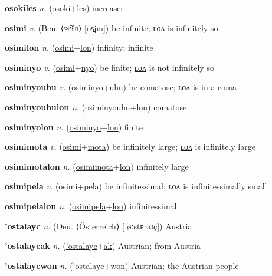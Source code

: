 \textbf{\hypertarget{osokiles}{osokiles}} \textit{n.} (\hyperlink{osoki}{osoki}+\allowbreak \hyperlink{les}{les})
increaser

\textbf{\hypertarget{osimi}{osimi}} \textit{v.} (Ben. ⟨{\bengali{}অসীম}⟩ [os̪im])
be infinite; \hyperlink{osimilon}{ʟᴏᴧ} is infinitely so

\textbf{\hypertarget{osimilon}{osimilon}} \textit{n.} (\hyperlink{osimi}{osimi}+\allowbreak \hyperlink{lon}{lon})
infinity; infinite

\textbf{\hypertarget{osiminyo}{osiminyo}} \textit{v.} (\hyperlink{osimi}{osimi}+\allowbreak \hyperlink{nyo}{nyo})
be finite; \hyperlink{osiminyolon}{ʟᴏᴧ} is not infinitely so

\textbf{\hypertarget{osiminyouhu}{osiminyouhu}} \textit{v.} (\hyperlink{osiminyo}{osiminyo}+\allowbreak \hyperlink{uhu}{uhu})
be comatose; \hyperlink{osiminyouhulon}{ʟᴏᴧ} is in a coma

\textbf{\hypertarget{osiminyouhulon}{osiminyouhulon}} \textit{n.} (\hyperlink{osiminyouhu}{osiminyouhu}+\allowbreak \hyperlink{lon}{lon})
comatose

\textbf{\hypertarget{osiminyolon}{osiminyolon}} \textit{n.} (\hyperlink{osiminyo}{osiminyo}+\allowbreak \hyperlink{lon}{lon})
finite

\textbf{\hypertarget{osimimota}{osimimota}} \textit{v.} (\hyperlink{osimi}{osimi}+\allowbreak \hyperlink{mota}{mota})
be infinitely large; \hyperlink{osimimotalon}{ʟᴏᴧ} is infinitely large

\textbf{\hypertarget{osimimotalon}{osimimotalon}} \textit{n.} (\hyperlink{osimimota}{osimimota}+\allowbreak \hyperlink{lon}{lon})
infinitely large

\textbf{\hypertarget{osimipela}{osimipela}} \textit{v.} (\hyperlink{osimi}{osimi}+\allowbreak \hyperlink{pela}{pela})
be infinitessimal; \hyperlink{osimipelalon}{ʟᴏᴧ} is infinitessimally small

\textbf{\hypertarget{osimipelalon}{osimipelalon}} \textit{n.} (\hyperlink{osimipela}{osimipela}+\allowbreak \hyperlink{lon}{lon})
infinitessimal

\textbf{\hypertarget{'ostalayc}{'ostalayc}} \textit{n.} (Deu. ⟨Österreich⟩ [ˈøːstɐraɪç])
Austria

\textbf{\hypertarget{'ostalaycak}{'ostalaycak}} \textit{n.} (\hyperlink{'ostalayc}{'ostalayc}+\allowbreak \hyperlink{ak}{ak})
Austrian; from Austria

\textbf{\hypertarget{'ostalaycwon}{'ostalaycwon}} \textit{n.} (\hyperlink{'ostalayc}{'ostalayc}+\allowbreak \hyperlink{won}{won})
Austrian; the Austrian people

